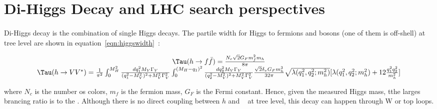 \section{Di-Higgs Decay and LHC search perspectives}
\paragraph{}
Di-Higgs decay is the combination of single Higgs decays. The partile width for Higgs to fermions and bosons (one of them is off-shell) at tree level are shown in equation~\ref{eqn:higgswidth}~\cite{Djouadi}:

\begin{equation}
\label{eqn:higgswidth}
\begin{array}{cc}
\Tau(h\to f\bar{f} ) = \frac{N_c \sqrt{2} G_{F} m_{f}^2 m_h}{8 \pi} \\
\Tau(h\to VV^{*} ) = \frac{1}{\pi^2} \int_{0}^{M_H^2} \frac{dq_1^2 M_V \Gamma_V}{(q_1^2-M_V^2)^2 + M_V^2\Gamma_V^2} \int_0^{(M_H - q_1)^2} \frac{dq_2^2 M_V \Gamma_V}{(q_2^2-M_V^2)^2 + M_V^2\Gamma_V^2} \frac{\sqrt{2} \delta_v G_{F} m_h^3}{32\pi} \sqrt{\lambda(q_1^2, q_2^2; m_h^2)} [\lambda(q_1^2, q_2^2; m_h^2) + 12\frac{q_1^2q_2^2}{m_h^2}]
\end{array}
\end{equation}

where $N_c$ is the number os colors, $m_f$ is the fermion mass, $G_{F}$ is the Fermi constant. Hence, given the measured Higgs mass, tthe larges brancing ratio is to the \bbbar. Although there is no direct coupling between $h$ and \gg~ at tree level, this decay can happen through W or top loops.

